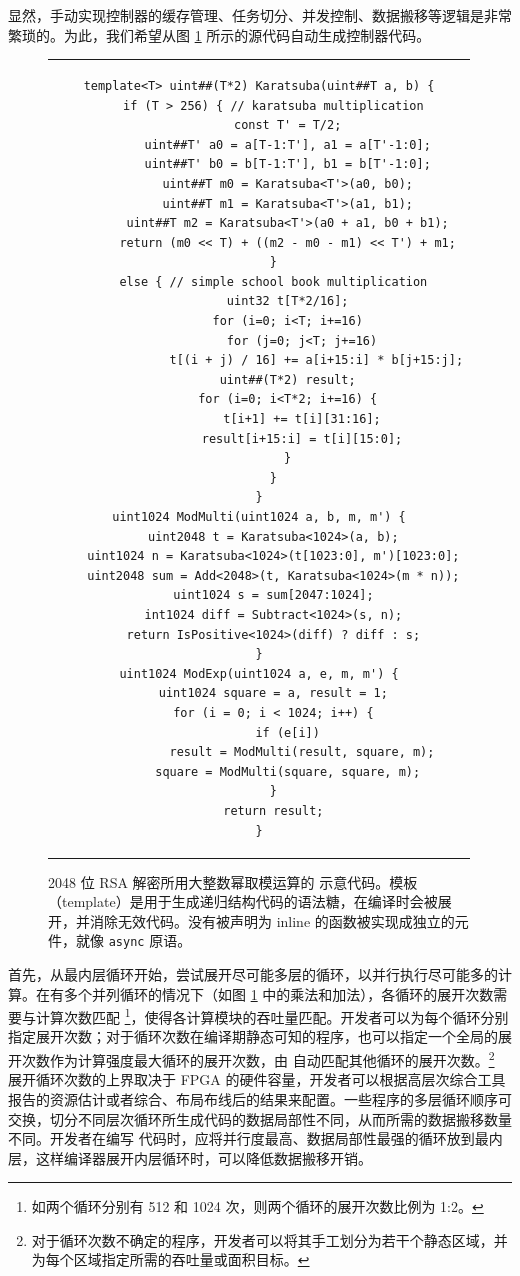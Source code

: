 显然，手动实现控制器的缓存管理、任务切分、并发控制、数据搬移等逻辑是非常繁琐的。为此，我们希望从图 \ref{clicknp:fig:rsa-code} 所示的源代码自动生成控制器代码。


\begin{figure}[t!]
	\renewcommand{\baselinestretch}{0.7}
	\small
	\centering
	\begin{tabular}{c}
\begin{lstlisting}
template<T> uint##(T*2) Karatsuba(uint##T a, b) {
    if (T > 256) { // karatsuba multiplication
        const T' = T/2;
        uint##T' a0 = a[T-1:T'], a1 = a[T'-1:0];
        uint##T' b0 = b[T-1:T'], b1 = b[T'-1:0];
        uint##T m0 = Karatsuba<T'>(a0, b0);
        uint##T m1 = Karatsuba<T'>(a1, b1);
        uint##T m2 = Karatsuba<T'>(a0 + a1, b0 + b1);
        return (m0 << T) + ((m2 - m0 - m1) << T') + m1;
    }
    else { // simple school book multiplication
        uint32 t[T*2/16];
        for (i=0; i<T; i+=16)
            for (j=0; j<T; j+=16)
                t[(i + j) / 16] += a[i+15:i] * b[j+15:j];
        uint##(T*2) result;
        for (i=0; i<T*2; i+=16) {
            t[i+1] += t[i][31:16];
            result[i+15:i] = t[i][15:0];
        }
    }
}
uint1024 ModMulti(uint1024 a, b, m, m') {
    uint2048 t = Karatsuba<1024>(a, b);
    uint1024 n = Karatsuba<1024>(t[1023:0], m')[1023:0];
    uint2048 sum = Add<2048>(t, Karatsuba<1024>(m * n));
    uint1024 s = sum[2047:1024];
    int1024 diff = Subtract<1024>(s, n);
    return IsPositive<1024>(diff) ? diff : s;
}
uint1024 ModExp(uint1024 a, e, m, m') {
    uint1024 square = a, result = 1;
    for (i = 0; i < 1024; i++) {
        if (e[i])
            result = ModMulti(result, square, m);
        square = ModMulti(square, square, m);
    }
    return result;
}
\end{lstlisting}
	\end{tabular}
	\caption{2048 位 RSA 解密所用大整数幂取模运算的 \name 示意代码。\name 模板（template）是用于生成递归结构代码的语法糖，在编译时会被展开，并消除无效代码。没有被声明为 inline 的函数被实现成独立的元件，就像 \texttt{async} 原语。}
	\label{clicknp:fig:rsa-code}
\end{figure}



首先，\name 从最内层循环开始，尝试展开尽可能多层的循环，以并行执行尽可能多的计算。在有多个并列循环的情况下（如图 \ref{clicknp:fig:rsa-code} 中的乘法和加法），各循环的展开次数需要与计算次数匹配 \footnote{如两个循环分别有 512 和 1024 次，则两个循环的展开次数比例为 1:2。}，使得各计算模块的吞吐量匹配。开发者可以为每个循环分别指定展开次数；对于循环次数在编译期静态可知的程序，也可以指定一个全局的展开次数作为计算强度最大循环的展开次数，由 \name 自动匹配其他循环的展开次数。\footnote{对于循环次数不确定的程序，开发者可以将其手工划分为若干个静态区域，并为每个区域指定所需的吞吐量或面积目标。} 展开循环次数的上界取决于 FPGA 的硬件容量，开发者可以根据高层次综合工具报告的资源估计或者综合、布局布线后的结果来配置。一些程序的多层循环顺序可交换，切分不同层次循环所生成代码的数据局部性不同，从而所需的数据搬移数量不同。开发者在编写 \name 代码时，应将并行度最高、数据局部性最强的循环放到最内层，这样编译器展开内层循环时，可以降低数据搬移开销。

